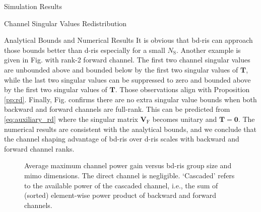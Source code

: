 \documentclass[journal]{IEEEtran}
\begin{document}
\begin{section}{Simulation Results}
\begin{subsection}{Channel Singular Values Redistribution}
\begin{subsubsection}{Analytical Bounds and Numerical Results}
		 It is obvious that \gls{bd}-\gls{ris} can approach those bounds better than \gls{d}-\gls{ris} especially for a small $N_\mathrm{S}$.
		 Another example is given in Fig.  with rank-2 forward channel.
		 The first two channel singular values are unbounded above and bounded below by the first two singular values of $\mathbf{T}$, while the last two singular values can be suppressed to zero and bounded above by the first two singular values of $\mathbf{T}$.
		 Those observations align with Proposition \ref{pp:rd}.
		 Finally, Fig.  confirms there are no extra singular value bounds when both backward and forward channels are full-rank.
		 This can be predicted from \eqref{eq:auxiliary_rd} where the singular matrix $\mathbf{V}_\mathrm{F}$ becomes unitary and $\mathbf{T}=\mathbf{0}$.
		 The numerical results are consistent with the analytical bounds, and we conclude that the channel shaping advantage of \gls{bd}-\gls{ris} over \gls{d}-\gls{ris} scales with backward and forward channel ranks.


		 \begin{figure}[!t]
			 \centering
			 \caption{
				 Average maximum channel power gain versus \gls{bd}-\gls{ris} group size and \gls{mimo} dimensions.
				 The direct channel is negligible.
				 `Cascaded' refers to the available power of the cascaded channel, i.e., the sum of (sorted) element-wise power product of backward and forward channels.
			 }
			 \label{fg:power_bond}
		 \end{figure}


\end{subsubsection}
\end{subsection}
\end{section}
\end{document}
